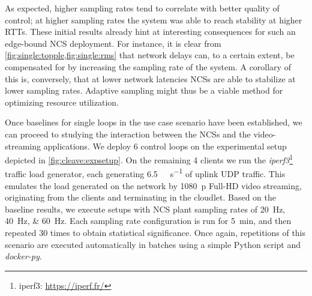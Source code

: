 As expected, higher sampling rates tend to correlate with better quality of control; at higher sampling rates the system was able to reach stability at higher \acp{RTT}.
These initial results already hint at interesting consequences for such an edge-bound \ac{NCS} deployment.
For instance, it is clear from \cref{fig:single:topple,fig:single:rms} that network delays can, to a certain extent, be compensated for by increasing the sampling rate of the system.
A corollary of this is, conversely, that at lower network latencies \acp{NCS} are able to stabilize at lower sampling rates.
Adaptive sampling might thus be a viable method for optimizing resource utilization.

Once baselines for single loops in the use case scenario have been established, we can proceed to studying the interaction between the \acp{NCS} and the video-streaming applications.
We deploy \num{6} control loops on the experimental setup depicted in \cref{fig:cleave:expsetup}.
On the remaining \num{4} clients we run the \emph{iperf3}\footnote{iperf3: \url{https://iperf.fr/}} traffic load generator, each generating \SI[per-mode=symbol]{6.5}{\mega\bit\per\second} of uplink \ac{UDP} traffic.
This emulates the load generated on the network by \SI{1080}{p} Full-HD video streaming, originating from the clients and terminating in the cloudlet.
Based on the baseline results, we execute setups with \ac{NCS} plant sampling rates of \SIlist{20;40;60}{\hertz}.
Each sampling rate configuration is run for \SI{5}{\minute}, and then repeated \num{30} times to obtain statistical significance.
Once again, repetitions of this scenario are executed automatically in batches using a simple Python script and \emph{docker-py}.

